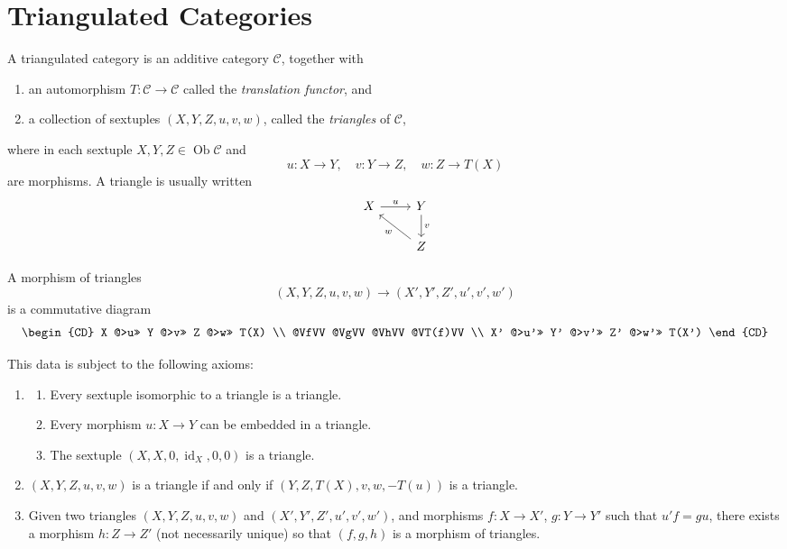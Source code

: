 \section{Triangulated Categories}\label{sec:1.1}
\begin{definition*}
A triangulated category is an additive category $\mathcal{C}$, together with
\begin{enumerate}
	\item[a)] an automorphism $T\colon \mathcal{C}\to\mathcal{C}$ called the \emph{translation functor}, and
	\item[b)] a collection of sextuples $(X,Y,Z,u,v,w)$, called the \emph{triangles} of $\mathcal{C}$,
\end{enumerate}
where in each sextuple $X,Y,Z\in\operatorname{Ob}\mathcal{C}$ and
\[
u\colon X\to Y,\quad v\colon Y\to Z,\quad w\colon Z\to T(X)
\]
are morphisms. A triangle is usually written
\[
\begin{tikzcd}
	X \arrow[r, "u"] & Y \arrow[d, "v"] \\
	& Z \arrow[ul, "w"]
\end{tikzcd}
\]


A morphism of triangles
\[
(X,Y,Z,u,v,w)\to(X',Y',Z',u',v',w')
\]
is a commutative diagram
\[
\begin{CD}
	X @>u>> Y @>v>> Z @>w>> T(X) \\
	@VfVV @VgVV @VhVV @VT(f)VV \\
	X' @>u'>> Y' @>v'>> Z' @>w'>> T(X')
\end{CD}
\]

This data is subject to the following axioms:

\begin{enumerate}
	\item[\textbf{(TR1)}]
	\begin{enumerate}
		\item Every sextuple isomorphic to a triangle is a triangle.
		\item Every morphism $u\colon X\to Y$ can be embedded in a triangle.
		\item The sextuple $(X,X,0,\operatorname{id}_X,0,0)$ is a triangle.
	\end{enumerate}

	\item[\textbf{(TR2)}]
	$(X,Y,Z,u,v,w)$ is a triangle if and only if $(Y,Z,T(X),v,w,-T(u))$ is a triangle.

	\item[\textbf{(TR3)}]
	Given two triangles $(X,Y,Z,u,v,w)$ and $(X',Y',Z',u',v',w')$, and morphisms $f\colon X\to X'$, $g\colon Y\to Y'$ such that $u'f=gu$, there exists a morphism $h\colon Z\to Z'$ (not necessarily unique) so that $(f,g,h)$ is a morphism of triangles.


\end{enumerate}
\end{definition*}
